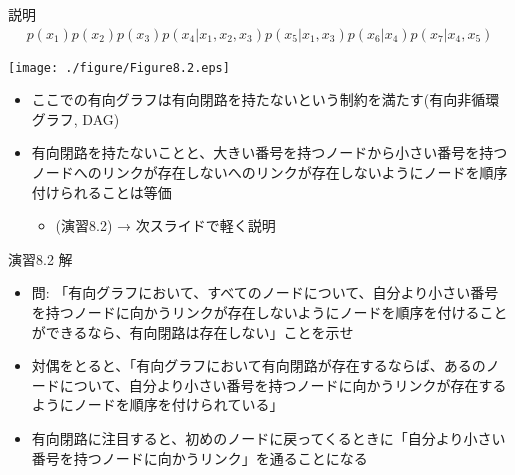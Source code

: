 \begin{frame}{説明}
 \begin{eqnarray*}
  p(x_1)p(x_2)p(x_3)p(x_4|x_1,x_2,x_3)p(x_5|x_1,x_3)p(x_6|x_4)p(x_7|x_4,x_5)
 \end{eqnarray*}
 \begin{center}
  \texttt{[image: ./figure/Figure8.2.eps]}
 \end{center}
 \begin{itemize}
  \item ここでの有向グラフは有向閉路を持たないという制約を満たす(有向非循環グラフ, DAG)
  \item 有向閉路を持たないことと、大きい番号を持つノードから小さい番号を持つノードへのリンクが存在しないへのリンクが存在しないようにノードを順序付けられることは等価
        \begin{itemize}
         \item (演習8.2) → 次スライドで軽く説明
        \end{itemize}
 \end{itemize}
\end{frame}

\begin{frame}{演習8.2 解}
 \begin{itemize}
  \item 問: 「有向グラフにおいて、すべてのノードについて、自分より小さい番号を持つノードに向かうリンクが存在しないようにノードを順序を付けることができるなら、有向閉路は存在しない」ことを示せ
  \item 対偶をとると、「有向グラフにおいて有向閉路が存在するならば、あるのノードについて、自分より小さい番号を持つノードに向かうリンクが存在するようにノードを順序を付けられている」
  \item 有向閉路に注目すると、初めのノードに戻ってくるときに「自分より小さい番号を持つノードに向かうリンク」を通ることになる
 \end{itemize}
\end{frame}
